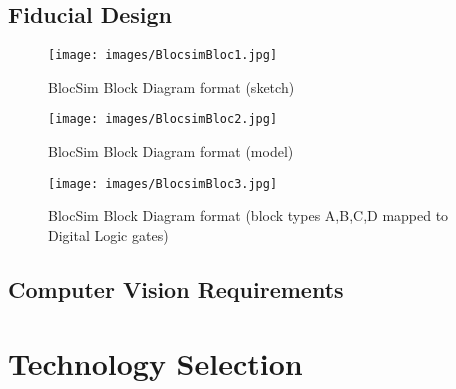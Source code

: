 \subsection{Fiducial Design}




\begin{figure}[ht!]
\centering
\texttt{[image: images/BlocsimBloc1.jpg]}
\caption{BlocSim Block Diagram format (sketch)}
\label{im:BlocsimBD1}
\end{figure}

\begin{figure}[ht!]
\centering
\texttt{[image: images/BlocsimBloc2.jpg]}
\caption{BlocSim Block Diagram format (model)}
\label{im:BlocsimBD2}
\end{figure}

\begin{figure}[ht!]
\centering
\texttt{[image: images/BlocsimBloc3.jpg]}
\caption{BlocSim Block Diagram format (block types A,B,C,D mapped to Digital Logic gates)}
\label{im:BlocsimBD3}
\end{figure}

\clearpage



\subsection{Computer Vision Requirements}
\label{sec:techSelection}





\section{Technology Selection}

